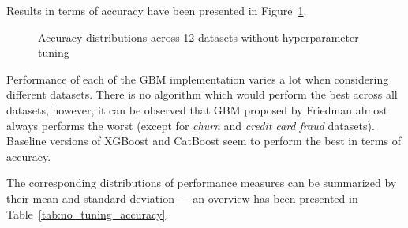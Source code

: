 \documentclass[magisterska, english]{pwr_wmat_praca_dyplomowa}
\theoremstyle{plain}
\numberwithin{theorem}{chapter}
\theoremstyle{definition}
\numberwithin{theorem}{chapter}
\begin{document}
Results in terms of accuracy have been presented in Figure~\ref{fig:no_tuning_accuracy}.

\begin{figure}[H]
	\centering
	\caption{Accuracy distributions across 12 datasets without hyperparameter tuning}
	\label{fig:no_tuning_accuracy}
\end{figure}

Performance of each of the GBM implementation varies a lot when considering different datasets. There is no algorithm which would perform the best across all datasets, however, it can be observed that GBM proposed by Friedman \cite{friedman_gbm} almost always performs the worst (except for \emph{churn} and \emph{credit card fraud} datasets). Baseline versions of XGBoost and CatBoost seem to perform the best in terms of accuracy.

The corresponding distributions of performance measures can be summarized by their mean and standard deviation --- an overview has been presented in Table~\ref{tab:no_tuning_accuracy}.
\end{document}
